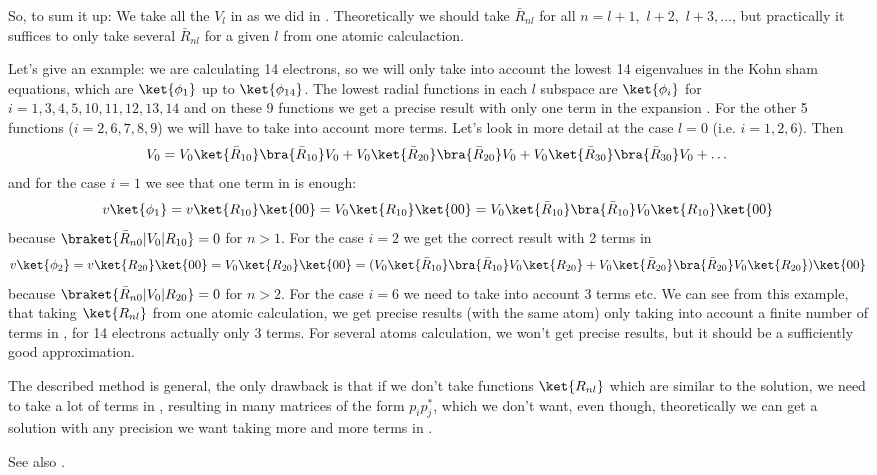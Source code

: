 So, to sum it up: We take all the $V_l$ in   as we did in .
Theoretically we should take $\bar R_{nl}$ for all 
$n=l+1,\,\, l+2,\,\,l+3,\dots$, 
but practically it suffices to only take several $\bar R_{nl}$ for a given $l$
from one atomic calculaction.

Let's give an example: we are calculating 14 electrons, so we will only
take into account the lowest 14 eigenvalues in the Kohn sham equations, which
are $\ket{\phi_1}$ up to $\ket{\phi_{14}}$. The lowest radial functions in each
$l$ subspace are $\ket{\phi_i}$ for $i=1,3,4,5,10,11,12,13,14$ and on these 9
functions we get a precise result with only one term in the expansion
. For the other 5 functions ($i=2,6,7,8,9$) we will have to take into
account more terms. Let's look in more detail at the case $l=0$ (i.e.
$i=1,2,6$). Then 
$$V_0=
V_0\ket{\bar R_{10}}\bra{\bar R_{10}}V_0+
V_0\ket{\bar R_{20}}\bra{\bar R_{20}}V_0+
V_0\ket{\bar R_{30}}\bra{\bar R_{30}}V_0+
\dots
$$
and for the case $i=1$ we see that one term in  is enough:
$$v\ket{\phi_1}=v\ket{R_{10}}\ket{00}=V_0\ket{R_{10}}\ket{00}=
V_0\ket{\bar R_{10}}\bra{\bar R_{10}}V_0\ket{R_{10}}\ket{00}
$$
because $\braket{\bar R_{n0}|V_0|R_{10}}=0$ for $n>1$.
For the case $i=2$ we get the correct result with 2 terms in 
$$v\ket{\phi_2}=v\ket{R_{20}}\ket{00}=V_0\ket{R_{20}}\ket{00}=(
V_0\ket{\bar R_{10}}\bra{\bar R_{10}}V_0\ket{R_{20}}+
V_0\ket{\bar R_{20}}\bra{\bar R_{20}}V_0\ket{R_{20}}
)\ket{00}
$$
because $\braket{\bar R_{n0}|V_0|R_{20}}=0$ for $n>2$.
For the case $i=6$ we need to take into account 3 terms etc. 
We can see from this example, that taking $\ket{R_{nl}}$ from one atomic
calculation, we get precise results (with the same atom) only taking into
account a finite number of terms in , for 14 electrons actually only
3 terms. For several atoms calculation, we won't get precise results, but it
should be a sufficiently good approximation.

The described method is general, the only drawback is that if we don't take
functions $\ket{R_{nl}}$ which are similar to the solution, we need to take a
lot of terms in , resulting in many matrices of the form $p_ip_j^*$,
which we don't want, even though, theoretically we can get a solution with any
precision we want taking more and more terms in .

See also \cite{blochl}.
